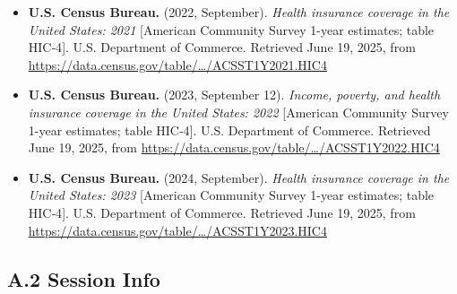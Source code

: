 \documentclass[
]{article}
\begin{document}
\begin{itemize}
{  coverage in the United States: 2019} {[}American Community Survey
  1-year estimates; table HIC‑4{]}. U.S. Department of Commerce.
  Retrieved June 19, 2025, from
  \url{https://data.census.gov/table/…/ACSST1Y2019.HIC4}
\item
  \textbf{U.S. Census Bureau.} (2022, September). \emph{Health insurance
  coverage in the United States: 2021} {[}American Community Survey
  1-year estimates; table HIC‑4{]}. U.S. Department of Commerce.
  Retrieved June 19, 2025, from
  \url{https://data.census.gov/table/…/ACSST1Y2021.HIC4}
\item
  \textbf{U.S. Census Bureau.} (2023, September 12). \emph{Income,
  poverty, and health insurance coverage in the United States: 2022}
  {[}American Community Survey 1-year estimates; table HIC‑4{]}. U.S.
  Department of Commerce. Retrieved June 19, 2025, from
  \url{https://data.census.gov/table/…/ACSST1Y2022.HIC4}
\item
  \textbf{U.S. Census Bureau.} (2024, September). \emph{Health insurance
  coverage in the United States: 2023} {[}American Community Survey
  1-year estimates; table HIC‑4{]}. U.S. Department of Commerce.
  Retrieved June 19, 2025, from
  \url{https://data.census.gov/table/…/ACSST1Y2023.HIC4}
\end{itemize}

\subsection{A.2 Session Info}\label{a.2-session-info}
\end{document}
